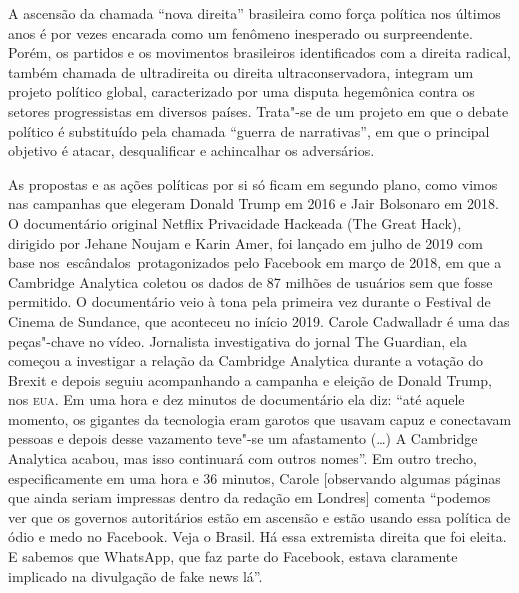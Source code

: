 

\noindent{}A ascensão da chamada ``nova direita'' brasileira como força política
nos últimos anos é por vezes encarada como um fenômeno inesperado ou
surpreendente. Porém, os partidos e os movimentos brasileiros
identificados com a direita radical, também chamada de ultradireita ou
direita ultraconservadora, integram um projeto político global,
caracterizado por uma disputa hegemônica contra os setores progressistas
em diversos países. Trata"-se de um projeto em que o debate político é
substituído pela chamada ``guerra de narrativas'', em que o principal
objetivo é atacar, desqualificar e achincalhar os adversários.

As propostas e as ações políticas por si só ficam em segundo plano, como
vimos nas campanhas que elegeram Donald Trump em 2016 e Jair Bolsonaro
em 2018. O documentário original Netflix Privacidade Hackeada (The Great
Hack), dirigido por Jehane Noujam e Karin Amer, foi lançado em julho de
2019 com base nos~escândalos~protagonizados pelo Facebook em março de
2018, em que a Cambridge Analytica coletou os dados de 87 milhões de
usuários sem que fosse permitido. O documentário veio à tona pela
primeira vez durante o Festival de Cinema de Sundance, que aconteceu no
início 2019. Carole Cadwalladr é uma das peças"-chave no vídeo.
Jornalista investigativa do jornal The Guardian, ela começou a
investigar a relação da Cambridge Analytica durante a votação do Brexit
e depois seguiu acompanhando a campanha e eleição de Donald Trump, nos
\textsc{eua}. Em uma hora e dez minutos de documentário ela diz: ``até aquele
momento, os gigantes da tecnologia eram garotos que usavam capuz e
conectavam pessoas e depois desse vazamento teve"-se um afastamento (\ldots{})
A Cambridge Analytica acabou, mas isso continuará com outros nomes''. Em
outro trecho, especificamente em uma hora e 36 minutos, Carole
{[}observando algumas páginas que ainda seriam impressas dentro da
redação em Londres{]} comenta ``podemos ver que os governos autoritários
estão em ascensão e estão usando essa política de ódio e medo no
Facebook. Veja o Brasil. Há essa extremista direita que foi eleita. E
sabemos que WhatsApp, que faz parte do Facebook, estava claramente
implicado na divulgação de fake news lá''.

